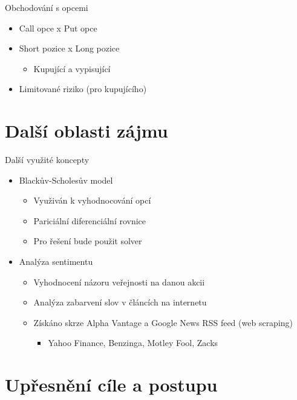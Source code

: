 \documentclass{beamer}
\begin{document}
\begin{frame}{Obchodování s opcemi}
  \begin{itemize}
    \item Call opce x Put opce
    \item Short pozice x Long pozice
      \begin{itemize}
        \item Kupující a vypisující %
      \end{itemize}
    \item Limitované riziko (pro kupujícího)
  \end{itemize}
\end{frame}

\section{Další oblasti zájmu}

\begin{frame}{Další využité koncepty}
  \begin{itemize}
    \item Blackův-Scholesův model
      \begin{itemize}
        \item Využiván k vyhodnocování opcí
        \item Pariciální diferenciální rovnice
        \item Pro řešení bude použit solver
      \end{itemize}
    \item Analýza sentimentu
      \begin{itemize}
        \item Vyhodnocení názoru veřejnosti na danou akcii
        \item Analýza zabarvení slov v článcích na internetu
        \item Získáno skrze Alpha Vantage a Google News RSS feed (web scraping)
          \begin{itemize}
            \item Yahoo Finance, Benzinga, Motley Fool, Zacks
          \end{itemize}
      \end{itemize}
  \end{itemize}
\end{frame}

\section{Upřesnění cíle a postupu}
\end{document}
